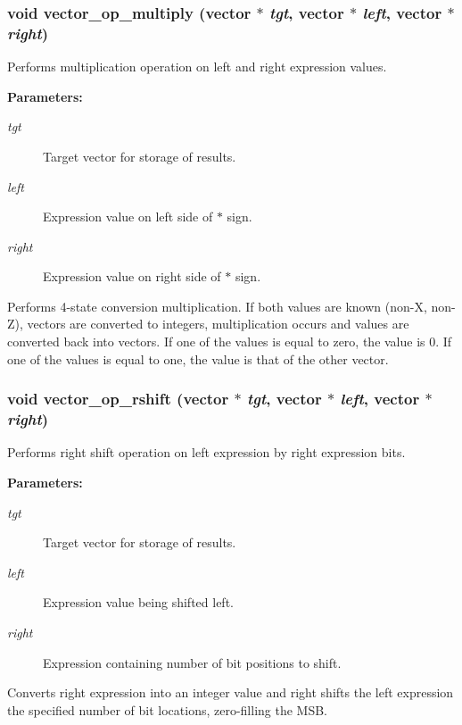 \subsubsection{\setlength{\rightskip}{0pt plus 5cm}void vector\_\-op\_\-multiply ({\bf vector} $\ast$ {\em tgt}, {\bf vector} $\ast$ {\em left}, {\bf vector} $\ast$ {\em right})}\label{vector_8h_a28}


Performs multiplication operation on left and right expression values.

\begin{Desc}
\item[{\bf Parameters: }]\par
\begin{description}
\item[
{\em tgt}]Target vector for storage of results. \item[
{\em left}]Expression value on left side of $\ast$ sign. \item[
{\em right}]Expression value on right side of $\ast$ sign.

\end{description}
\end{Desc}
Performs 4-state conversion multiplication. If both values are known (non-X, non-Z), vectors are converted to integers, multiplication occurs and values are converted back into vectors. If one of the values is equal to zero, the value is 0. If one of the values is equal to one, the value is that of the other vector. 
\subsubsection{\setlength{\rightskip}{0pt plus 5cm}void vector\_\-op\_\-rshift ({\bf vector} $\ast$ {\em tgt}, {\bf vector} $\ast$ {\em left}, {\bf vector} $\ast$ {\em right})}\label{vector_8h_a25}


Performs right shift operation on left expression by right expression bits.

\begin{Desc}
\item[{\bf Parameters: }]\par
\begin{description}
\item[
{\em tgt}]Target vector for storage of results. \item[
{\em left}]Expression value being shifted left. \item[
{\em right}]Expression containing number of bit positions to shift.

\end{description}
\end{Desc}
Converts right expression into an integer value and right shifts the left expression the specified number of bit locations, zero-filling the MSB. 
